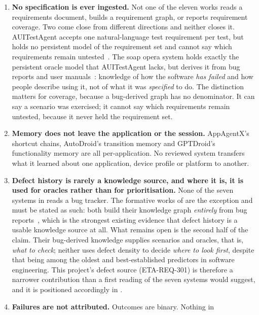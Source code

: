 \begin{enumerate}[label=\textbf{G\arabic*.},leftmargin=3.0em]
  \item \textbf{No specification is ever ingested.} Not one of the eleven works
    reads a requirements document, builds a requirement graph, or reports
    requirement coverage. Two come close from different directions and neither
    closes it. AUITestAgent accepts one natural-language test requirement per
    test, but holds no persistent model of the requirement set and cannot say
    which requirements remain untested~\cite{auitestagent}. The soap opera
    system holds exactly the persistent oracle model that AUITestAgent lacks,
    but derives it from bug reports and user manuals~\cite{soapopera,etkg}:
    knowledge of how the software \emph{has failed} and how people describe
    using it, not of what it was \emph{specified} to do. The distinction
    matters for coverage, because a bug-derived graph has no denominator. It
    can say a scenario was exercised; it cannot say which requirements remain
    untested, because it never held the requirement set.
  \item \textbf{Memory does not leave the application or the session.}
    AppAgentX's shortcut chains, AutoDroid's transition memory and GPTDroid's
    functionality memory are all per-application. No reviewed system transfers
    what it learned about one application, device profile or platform to
    another.
  \item \textbf{Defect history is rarely a knowledge source, and where it is,
    it is used for oracles rather than for prioritisation.} None of the seven
    systems in  reads a bug tracker. The formative works
    of  are the exception and must be stated as such:
    both build their knowledge graph \emph{entirely} from bug
    reports~\cite{etkg,soapopera}, which is the strongest existing evidence
    that defect history is a usable knowledge source at all. What remains open
    is the second half of the claim. Their bug-derived knowledge supplies
    scenarios and oracles, that is, \emph{what to check}; neither uses defect
    density to decide \emph{where to look first}, despite that being among the
    oldest and best-established predictors in software engineering. This
    project's defect source (ETA-REQ-301) is therefore a narrower contribution
    than a first reading of the seven systems would suggest, and it is
    positioned accordingly in .
  \item \textbf{Failures are not attributed.} Outcomes are binary. Nothing in

\end{enumerate}
